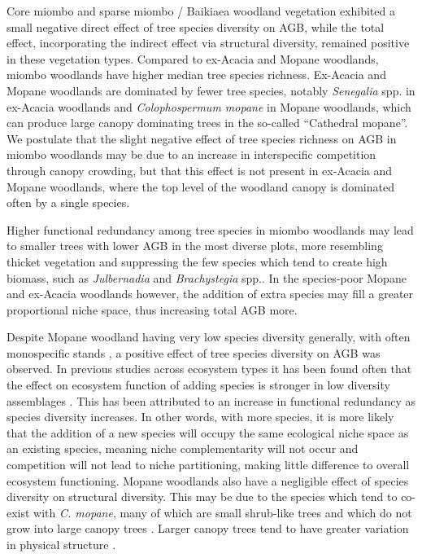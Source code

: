 \documentclass[11pt,a4paper]{article}
\begin{document}
Core miombo and sparse miombo / Baikiaea woodland vegetation exhibited a small negative direct effect of tree species diversity on AGB, while the total effect, incorporating the indirect effect via structural diversity, remained positive in these vegetation types. Compared to ex-Acacia and Mopane woodlands, miombo woodlands have higher median tree species richness. Ex-Acacia and Mopane woodlands are dominated by fewer tree species, notably \textit{Senegalia} spp. in ex-Acacia woodlands and \textit{Colophospermum mopane} in Mopane woodlands, which can produce large canopy dominating trees in the so-called ``Cathedral mopane''. We postulate that the slight negative effect of tree species richness on AGB in miombo woodlands may be due to an increase in interspecific competition through canopy crowding, but that this effect is not present in ex-Acacia and Mopane woodlands, where the top level of the woodland canopy is dominated often by a single species. 

Higher functional redundancy among tree species in miombo woodlands may lead to smaller trees with lower AGB in the most diverse plots, more resembling thicket vegetation and suppressing the few species which tend to create high biomass, such as \textit{Julbernadia} and \textit{Brachystegia} spp.. In the species-poor Mopane and ex-Acacia woodlands however, the addition of extra species may fill a greater proportional niche space, thus increasing total AGB more. 

Despite Mopane woodland having very low species diversity generally, with often monospecific stands \citep{Timberlake2010}, a positive effect of tree species diversity on AGB was observed. In previous studies across ecosystem types it has been found often that the effect on ecosystem function of adding species is stronger in low diversity assemblages \citep{Cardinale2006, Srivastava2005}. This has been attributed to an increase in functional redundancy as species diversity increases. In other words, with more species, it is more likely that the addition of a new species will occupy the same ecological niche space as an existing species, meaning niche complementarity will not occur and competition will not lead to niche partitioning, making little difference to overall ecosystem functioning. Mopane woodlands also have a negligible effect of species diversity on structural diversity. This may be due to the species which tend to co-exist with \textit{C. mopane}, many of which are small shrub-like trees and which do not grow into large canopy trees \citep{Timberlake2010}. Larger canopy trees tend to have greater variation in physical structure \citep{Seidel2019}. 
\end{document}
